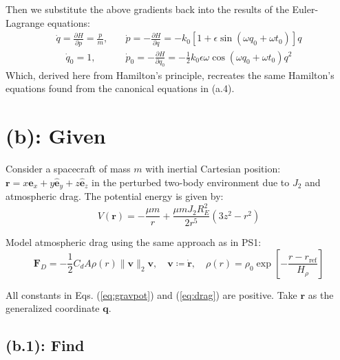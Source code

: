 \documentclass[titlepage]{article}
\begin{document}
\begin{mdframed}[linewidth=1pt, innertopmargin=10pt, innerbottommargin=10pt]
	Then we substitute the above gradients back into the results of the Euler-Lagrange equations:
	\begin{equation}
		\begin{split}
			\dot{q}=\frac{\partial H}{\partial p}=\frac{p}{m},\quad& \dot{p}=-\frac{\partial H}{\partial q}=-k_0\left[1+\epsilon\sin\left(\omega q_0+\omega t_0\right)\right]q \\
			\quad\dot{q}_0=1,\quad& \dot{p}_0=-\frac{\partial H}{\partial q_0}=-\frac{1}{2}k_0\epsilon\omega\cos\left(\omega q_0+\omega t_0\right)q^2
		\end{split}
	\end{equation}
	Which, derived here from Hamilton's principle, recreates the same Hamilton's equations found from the canonical equations in (a.4).
\end{mdframed}

\newpage

\section*{(b): Given}

Consider a spacecraft of mass $m$ with inertial Cartesian position: $\boldsymbol{r}=x\hat{\boldsymbol{e}}_x+y\hat{\boldsymbol{e}}_y+z\hat{\boldsymbol{e}}_z$ in the perturbed two-body environment due to $J_2$ and atmospheric drag. The potential energy is given by:
\begin{equation}
	V(\boldsymbol{r})=-\frac{\mu m}{r}+\frac{\mu mJ_2R_E^2}{2r^5}\left(3z^2-r^2\right)
	\label{eq:gravpot}
\end{equation}

Model atmospheric drag using the same approach as in PS1:
\begin{equation}
	\boldsymbol{F}_D=-\frac{1}{2}C_dA\rho(r)\|\boldsymbol{v}\|_2\boldsymbol{v},\quad \boldsymbol{v}\coloneqq\dot{\boldsymbol{r}},\quad\rho(r)=\rho_0\exp\left[-\frac{r-r_{\text{ref}}}{H_\rho}\right]
	\label{eq:drag}
\end{equation}

All constants in Eqs. (\ref{eq:gravpot}) and (\ref{eq:drag}) are positive. Take $\boldsymbol{r}$ as the generalized coordinate $\boldsymbol{q}$.

\subsection*{(b.1): Find}
\end{document}
